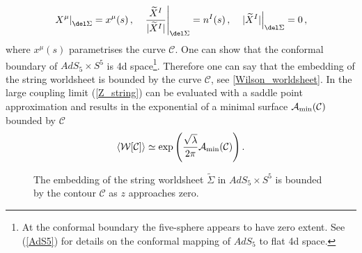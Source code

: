 %
%
\begin{equation}
\left. X^{\mu} \right\vert_{\del \Sigma} = x^{\mu}(s) \,,\quad   \left.\frac{\widetilde{X}^{I}}{\vert \widetilde{X}^{I}\vert} \right\vert_{\del \Sigma} = n^{I}(s) \,, \quad   \left. \vert \widetilde{X}^{I} \vert \right\vert_{\del \Sigma} = 0\,,
\end{equation}
%
%
where $x^{\mu}(s)$ parametrises the curve $\mathcal{C}$. One can show that the conformal boundary of $AdS_{5}\times S^{5}$ is 4d  space\footnote{At the conformal boundary the five-sphere appears to have zero extent. See (\ref{AdS5}) for details on the conformal mapping of $AdS_{5}$ to flat 4d  space.}. Therefore one can say that the embedding of the string worldsheet is bounded by the curve $\mathcal{C}$, see \autoref{Wilson_worldsheet}. In the large  coupling limit (\ref{Z_string}) can be evaluated with a saddle point approximation and results in the exponential of a minimal surface $\mathcal{A}_{\rm min}(\mathcal{C})$ bounded by $\mathcal{C}$
%
%
\begin{equation}
\langle \mathcal{W}[\mathcal{C}]\rangle \simeq \exp \left( \frac{\sqrt{\lambda}}{2\pi} \mathcal{A}_{\rm min}(\mathcal{C}) \right).
\end{equation}
%
%
\begin{figure}
\begin{center}
\caption{The embedding of the string worldsheet $\widetilde{\Sigma}$ in $AdS_{5}\times S^{5}$ is bounded by the contour $\mathcal{C}$ as $z$ approaches zero.\label{Wilson_worldsheet}}
\end{center}
\end{figure}
%
%
%
%
%
%
%
